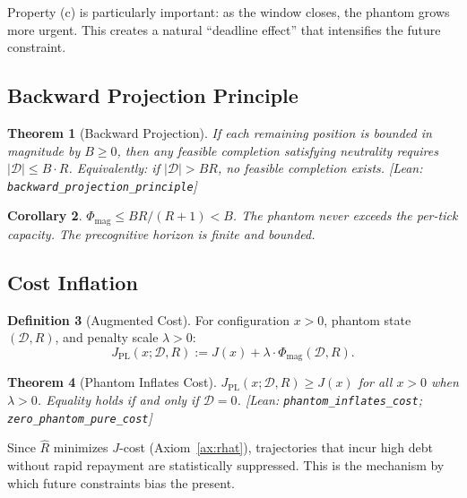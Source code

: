 \documentclass[11pt, a4paper]{article}
\newcommand{\Rhat}{\hat{R}}
\newcommand{\leanref}[1]{\texttt{\small #1}}
\newtheorem{theorem}{Theorem}[section]
\newtheorem{corollary}[theorem]{Corollary}
\theoremstyle{definition}
\newtheorem{definition}[theorem]{Definition}
\theoremstyle{remark}
\begin{document}
Property (c) is particularly important: as the window closes,
the phantom grows more urgent. This creates a natural ``deadline
effect'' that intensifies the future constraint.

\subsection{Backward Projection Principle}

\begin{theorem}[Backward Projection]\label{thm:backward}
If each remaining position is bounded in magnitude by $B \geq 0$,
then any feasible completion satisfying neutrality requires
$|\mathcal{D}| \leq B \cdot R$. Equivalently: if
$|\mathcal{D}| > BR$, no feasible completion exists.
\textup{[Lean: \leanref{backward\_projection\_principle}]}
\end{theorem}

\begin{corollary}
$\Phi_{\mathrm{mag}} \leq BR/(R+1) < B$. The phantom never
exceeds the per-tick capacity. The precognitive horizon is finite
and bounded.
\end{corollary}

\subsection{Cost Inflation}

\begin{definition}[Augmented Cost]\label{def:augmented}
For configuration $x > 0$, phantom state $(\mathcal{D}, R)$, and
penalty scale $\lambda > 0$:
\begin{equation}\label{eq:augmented}
    J_{\mathrm{PL}}(x; \mathcal{D}, R)
    := J(x) + \lambda \cdot \Phi_{\mathrm{mag}}(\mathcal{D}, R).
\end{equation}
\end{definition}

\begin{theorem}[Phantom Inflates Cost]\label{thm:inflates}
$J_{\mathrm{PL}}(x; \mathcal{D}, R) \geq J(x)$ for all $x > 0$
when $\lambda > 0$. Equality holds if and only if $\mathcal{D} = 0$.
\textup{[Lean: \leanref{phantom\_inflates\_cost};
\leanref{zero\_phantom\_pure\_cost}]}
\end{theorem}

Since $\Rhat$ minimizes $J$-cost (Axiom~\ref{ax:rhat}),
trajectories that incur high debt without rapid repayment are
statistically suppressed. This is the mechanism by which future
constraints bias the present.
\end{document}
